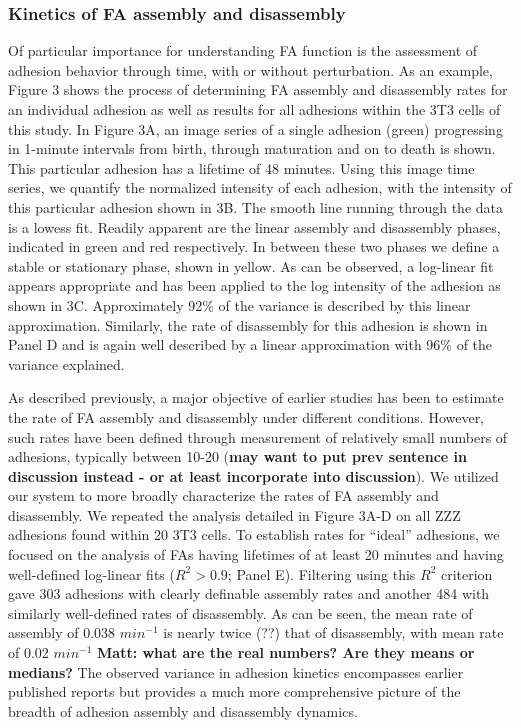 \documentclass[10pt]{article}
\begin{document}
\subsubsection*{Kinetics of FA assembly and disassembly}
Of particular importance for understanding FA function is the assessment of adhesion
behavior through time, with or without perturbation. As an example, Figure 3
shows the process of determining FA assembly and disassembly rates for an
individual adhesion as well as results for all adhesions within the 3T3 cells of
this study. In Figure 3A, an image series of a single adhesion (green) progressing
in 1-minute intervals from birth, through maturation and on to death is shown.
This particular adhesion has a lifetime of 48 minutes. Using this image time
series, we quantify the normalized intensity of each adhesion, with the
intensity of this particular adhesion shown in 3B. The smooth line running
through the data is a lowess fit. Readily apparent are the linear assembly and
disassembly phases, indicated in green and red respectively. In between these
two phases we define a stable or stationary phase, shown in yellow. As can be
observed, a log-linear fit appears appropriate and has been applied to the log
intensity of the adhesion as shown in 3C. Approximately 92\% of the
variance is described by this linear approximation. Similarly, the rate of
disassembly for this adhesion is shown in Panel D and is again well described by
a linear approximation with 96\% of the variance explained.

As described previously, a major objective of earlier studies has been to
estimate the rate of FA assembly and disassembly under different conditions.
However, such rates have been defined through measurement of relatively small
numbers of adhesions, typically between 10-20 (\textbf{may want to put prev sentence in
discussion instead - or at least incorporate into discussion}). We utilized our
system to more broadly characterize the rates of FA assembly and disassembly. We
repeated the analysis detailed in Figure 3A-D on all ZZZ adhesions found within
20 3T3 cells. To establish rates for ``ideal'' adhesions, we focused on the
analysis of FAs having lifetimes of at least 20 minutes and having well-defined
log-linear fits ($R^2 > 0.9$; Panel E). Filtering using this $R^2$ criterion
gave 303 adhesions with clearly definable assembly rates and another 484 with
similarly well-defined rates of disassembly. As can be seen, the mean rate of
assembly of 0.038 $min^{-1}$ is nearly twice (??) that of disassembly, with mean
rate of 0.02 $min^{-1}$ \textbf{Matt: what are the real numbers? Are they means
or medians?} The observed variance in adhesion kinetics encompasses earlier published reports but provides a much more comprehensive picture of the breadth of adhesion assembly and disassembly dynamics.
\end{document}
